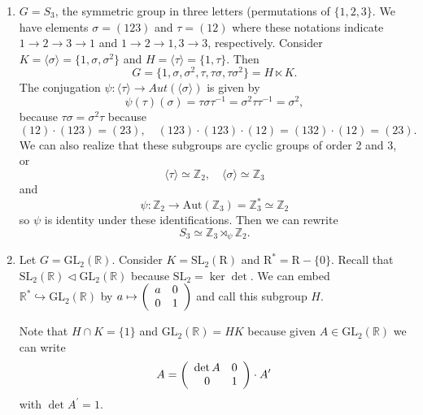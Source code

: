 \begin{xmpl}
\begin{enumerate}
  \item{$G = S_3$, the symmetric group in three letters (permutations
      of $\{1,2,3\}$. We have elements $\sigma = (1 2 3)$ and
      $\tau = (1 2)$ where these notations indicate $1 \to 2 \to 3 \to
      1$ and $1 \to 2 \to 1, 3 \to 3$, respectively. Consider
      $K = \langle \sigma \rangle = \{1, \sigma, \sigma^2\}$ and
      $H = \langle \tau \rangle = \{1, \tau\}$. Then
      $$
      G = \{1, \sigma, \sigma^2, \tau, \tau \sigma, \tau \sigma^2\}
        = H \ltimes K.
      $$
      The conjugation
      $\psi : \langle \tau \rangle \to Aut(\langle \sigma \rangle)$
      is given by
      $$
      \psi(\tau)(\sigma) = \tau \sigma \tau^{-1}
                         = \sigma^2 \tau \tau^{-1}
                         = \sigma^2,
      $$
      because $\tau \sigma = \sigma^2 \tau$ because
      $$
      (1 2) \cdot (1 2 3) = (2 3), \quad
      (1 2 3) \cdot (1 2 3) \cdot (1 2)
        = (1 3 2) \cdot (1 2) = (2 3).
      $$
      We can also realize that these subgroups are cyclic
      groups of order 2 and 3, or
      $$
      \langle \tau \rangle \simeq \mathbb{Z}_2, \quad
      \langle \sigma \rangle \simeq \mathbb{Z}_3
      $$
      and
      $$
      \psi : \mathbb{Z}_2
           \to \mathrm{Aut}(\mathbb{Z}_3)
           =   \mathbb{Z}_3^* \simeq \mathbb{Z}_2
      $$
      so $\psi$ is identity under these identifications.
      Then we can rewrite
      $$
      S_3 \simeq \mathbb{Z}_3 \rtimes_\psi \mathbb{Z}_2.
      $$
      }
  \item{Let $G = \mathrm{GL}_2(\mathbb{R})$. Consider
        $K = \mathrm{SL}_2(\mathrm{R})$ and
        $\mathrm{R}^* = \mathrm{R} - \{ 0 \}.$
        Recall that
        $\mathrm{SL}_2(\mathbb{R}) \triangleleft
        \mathrm{GL}_2(\mathbb{R})$
        because $\mathrm{SL}_2 = \ker \det$.
        We can embed
        $\mathbb{R}^* \hookrightarrow \mathrm{GL}_2(\mathbb{R})$
        by $a \mapsto \left(\begin{array}{c c} a & 0 \\ 0 &
            1\end{array}\right)$ and call this subgroup $H$.

        Note that $H \cap K = \{ 1 \}$ and
        $\mathrm{GL}_2(\mathbb{R}) = H K$ because
        given $A \in \mathrm{GL}_2(\mathbb{R})$ we can write
        $$
        A = \left(\begin{array}{c c}
              \det A & 0 \\ 0 & 1
            \end{array}\right) \cdot A^\prime
        $$
        with $\det A^\prime = 1$.

}
\end{enumerate}
\end{xmpl}
